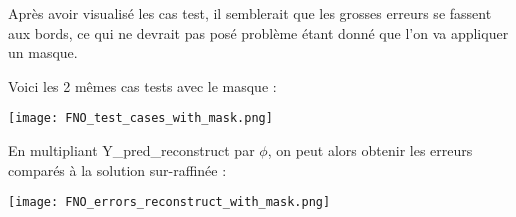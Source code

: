 Après avoir visualisé les cas test, il semblerait que les grosses erreurs se fassent aux bords, ce qui ne devrait pas posé problème étant donné que l'on va appliquer un masque.

\newpage

Voici les 2 mêmes cas tests avec le masque :

\begin{minipage}{\linewidth}
	\centering
	\texttt{[image: FNO\_test\_cases\_with\_mask.png]}
\end{minipage}

En multipliant Y\_pred\_reconstruct par $\phi$, on peut alors obtenir les erreurs comparés à la solution sur-raffinée :

\begin{minipage}{\linewidth}
	\centering
	\texttt{[image: FNO\_errors\_reconstruct\_with\_mask.png]}
\end{minipage}

